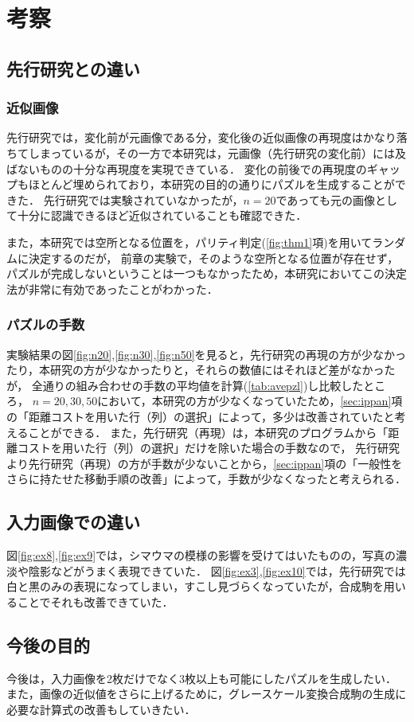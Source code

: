 \chapter{考察}
\label{chp:fifth}
\section{先行研究との違い}
\subsection{近似画像}
先行研究では，変化前が元画像である分，変化後の近似画像の再現度はかなり落ちてしまっているが，その一方で本研究は，元画像（先行研究の変化前）には及ばないものの十分な再現度を実現できている．
変化の前後での再現度のギャップもほとんど埋められており，本研究の目的の通りにパズルを生成することができた．
先行研究では実験されていなかったが，$n=20$であっても元の画像として十分に認識できるほど近似されていることも確認できた．

また，本研究では空所となる位置を，パリティ判定(\ref{fig:thm1}項)を用いてランダムに決定するのだが，
前章の実験で，そのような空所となる位置が存在せず，パズルが完成しないということは一つもなかったため，本研究においてこの決定法が非常に有効であったことがわかった．
\subsection{パズルの手数}
実験結果の図\ref{fig:n20},\ref{fig:n30},\ref{fig:n50}を見ると，先行研究の再現の方が少なかったり，本研究の方が少なかったりと，それらの数値にはそれほど差がなかったが，
全通りの組み合わせの手数の平均値を計算(\ref{tab:avepzl})し比較したところ，
$n=20,30,50$において，本研究の方が少なくなっていたため，\ref{sec:ippan}項の「距離コストを用いた行（列）の選択」によって，多少は改善されていたと考えることができる．
また，先行研究（再現）は，本研究のプログラムから「距離コストを用いた行（列）の選択」だけを除いた場合の手数なので，
先行研究より先行研究（再現）の方が手数が少ないことから，\ref{sec:ippan}項の「一般性をさらに持たせた移動手順の改善」によって，手数が少なくなったと考えられる．
\section{入力画像での違い}
図\ref{fig:ex8},\ref{fig:ex9}では，シマウマの模様の影響を受けてはいたものの，写真の濃淡や陰影などがうまく表現できていた．
図\ref{fig:ex3},\ref{fig:ex10}では，先行研究では白と黒のみの表現になってしまい，すこし見づらくなっていたが，合成駒を用いることでそれも改善できていた．
\section{今後の目的}
今後は，入力画像を2枚だけでなく3枚以上も可能にしたパズルを生成したい．
また，画像の近似値をさらに上げるために，グレースケール変換合成駒の生成に必要な計算式の改善もしていきたい．
